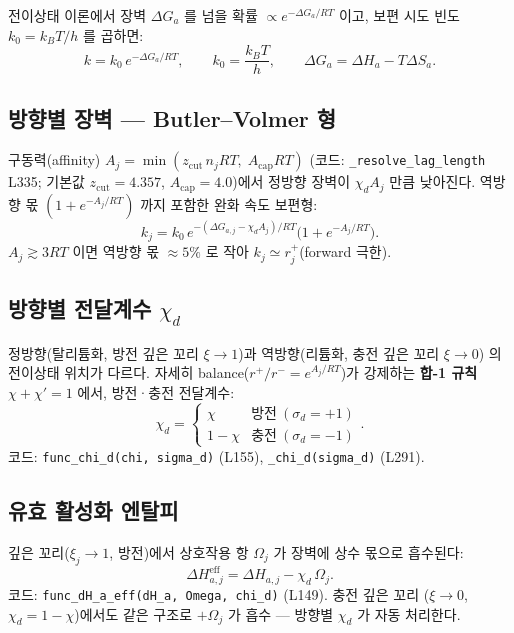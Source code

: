 \documentclass[11pt,a4paper]{article}
\newcommand{\eff}{\mathrm{eff}}
\begin{document}
전이상태 이론에서 장벽 $\Delta G_a$ 를 넘을 확률 $\propto e^{-\Delta G_a/RT}$ 이고,
보편 시도 빈도 $k_0 = k_BT/h$ 를 곱하면:
\begin{equation}
k = k_0\,e^{-\Delta G_a/RT},\qquad k_0=\frac{k_BT}{h},\qquad
\Delta G_a = \Delta H_a - T\Delta S_a.
\label{eq:eyring}
\end{equation}

\subsection{방향별 장벽 — Butler--Volmer 형}

구동력(affinity) $A_j = \min(z_\mathrm{cut}\,n_jRT,\;A_\mathrm{cap}RT)$
(코드: \texttt{\_resolve\_lag\_length} L335; 기본값 $z_\mathrm{cut}=4.357$,
$A_\mathrm{cap}=4.0$)에서 정방향 장벽이 $\chi_dA_j$ 만큼 낮아진다. 역방향 몫 $(1+e^{-A_j/RT})$ 까지 포함한 완화 속도 보편형:
\begin{equation}
k_j = k_0\,e^{-(\Delta G_{a,j}-\chi_dA_j)/RT}\bigl(1+e^{-A_j/RT}\bigr).
\label{eq:kuniv}
\end{equation}
$A_j \gtrsim 3RT$ 이면 역방향 몫 $\approx 5\%$ 로 작아 $k_j \simeq r_j^+$(forward 극한).

\subsection{방향별 전달계수 $\chi_d$}

정방향(탈리튬화, 방전 깊은 꼬리 $\xi\to1$)과 역방향(리튬화, 충전 깊은 꼬리 $\xi\to0$)
의 전이상태 위치가 다르다. 자세히 balance($r^+/r^- = e^{A_j/RT}$)가 강제하는
\textbf{합-1 규칙} $\chi + \chi' = 1$ 에서, 방전·충전 전달계수:
\begin{equation}
\chi_d = \begin{cases} \chi & \text{방전}\ (\sigma_d=+1) \\ 1-\chi & \text{충전}\ (\sigma_d=-1) \end{cases}.
\label{eq:chid}
\end{equation}
코드: \texttt{func\_chi\_d(chi, sigma\_d)} (L155), \texttt{\_chi\_d(sigma\_d)} (L291).

\subsection{유효 활성화 엔탈피}

깊은 꼬리($\xi_j\to1$, 방전)에서 상호작용 항 $\Omega_j$ 가 장벽에 상수 몫으로
흡수된다:
\begin{equation}
\Delta H_{a,j}^\eff = \Delta H_{a,j} - \chi_d\,\Omega_j.
\label{eq:dHeff}
\end{equation}
코드: \texttt{func\_dH\_a\_eff(dH\_a, Omega, chi\_d)} (L149). 충전 깊은 꼬리
($\xi\to0$, $\chi_d=1-\chi$)에서도 같은 구조로 $+\Omega_j$ 가 흡수 — 방향별
$\chi_d$ 가 자동 처리한다.
\end{document}

